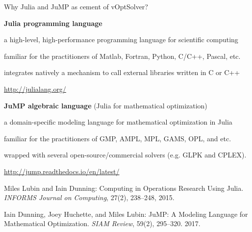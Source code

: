 \documentclass[10pt,xcolor=dvipsnames]{beamer}
\begin{document}
\begin{frame}{Why Julia and JuMP as cement of vOptSolver?}

\textbf{Julia programming language}
\begin{itemize}
\footnotesize{
    \item a high-level, high-performance programming language for scientific computing\vspace{-1mm}
    \item familiar for the practitioners of Matlab, Fortran, Python, C/C++, Pascal, etc.\vspace{-1mm}
    \item integrates natively a mechanism to call external libraries written in C or C++ \vspace{-1mm}
    \item  \url{http://julialang.org/}
}
\end{itemize}

\medskip

\textbf{JuMP algebraic language} (Julia for mathematical optimization)
\begin{itemize}
\footnotesize{
    \item a domain-specific modeling language for mathematical optimization in Julia\vspace{-1mm}
    \item familiar for the practitioners of GMP, AMPL, MPL, GAMS, OPL, and etc.\vspace{-1mm}
    \item wrapped with several open-source/commercial solvers (e.g. GLPK and CPLEX).\vspace{-1mm}
    \item  \url{http://jump.readthedocs.io/en/latest/}
    }
\end{itemize}

\bigskip


\footnotesize{
Miles Lubin and Iain Dunning:
Computing in Operations Research Using Julia.
\textit{INFORMS Journal on Computing}, 27(2), 238--248, 2015.

Iain Dunning, Joey Huchette, and Miles Lubin: 
JuMP: A Modeling Language for Mathematical Optimization.
 \textit{SIAM Review}, 59(2), 295--320. 2017.
}
    
\end{frame}
\end{document}
